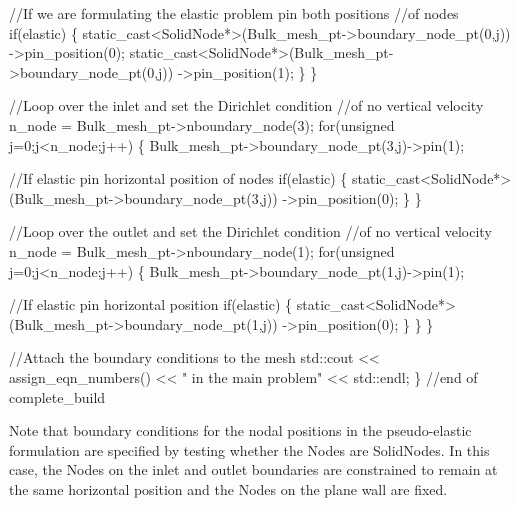 \begin{DoxyCodeInclude}
      \textcolor{comment}{//If we are formulating the elastic problem pin both positions}
      \textcolor{comment}{//of nodes}
      \textcolor{keywordflow}{if}(elastic)
       \{
        \textcolor{keyword}{static\_cast<}SolidNode*\textcolor{keyword}{>}(Bulk\_mesh\_pt->boundary\_node\_pt(0,j))
         ->pin\_position(0);
        \textcolor{keyword}{static\_cast<}SolidNode*\textcolor{keyword}{>}(Bulk\_mesh\_pt->boundary\_node\_pt(0,j))
         ->pin\_position(1);
       \}
     \}
    
    \textcolor{comment}{//Loop over the inlet and set the Dirichlet condition}
    \textcolor{comment}{//of no vertical velocity}
    n\_node = Bulk\_mesh\_pt->nboundary\_node(3);
    \textcolor{keywordflow}{for}(\textcolor{keywordtype}{unsigned} j=0;j<n\_node;j++)
     \{
      Bulk\_mesh\_pt->boundary\_node\_pt(3,j)->pin(1);

      \textcolor{comment}{//If elastic pin horizontal position of nodes}
      \textcolor{keywordflow}{if}(elastic)
       \{ 
        \textcolor{keyword}{static\_cast<}SolidNode*\textcolor{keyword}{>}(Bulk\_mesh\_pt->boundary\_node\_pt(3,j))
         ->pin\_position(0);
       \}
     \}
    
    \textcolor{comment}{//Loop over the outlet and set the Dirichlet condition}
    \textcolor{comment}{//of no vertical velocity}
    n\_node = Bulk\_mesh\_pt->nboundary\_node(1);
    \textcolor{keywordflow}{for}(\textcolor{keywordtype}{unsigned} j=0;j<n\_node;j++)
     \{
      Bulk\_mesh\_pt->boundary\_node\_pt(1,j)->pin(1);

      \textcolor{comment}{//If elastic pin horizontal position}
      \textcolor{keywordflow}{if}(elastic)
       \{ 
        \textcolor{keyword}{static\_cast<}SolidNode*\textcolor{keyword}{>}(Bulk\_mesh\_pt->boundary\_node\_pt(1,j))
         ->pin\_position(0);
       \}
     \}
   \}
 
   \textcolor{comment}{//Attach the boundary conditions to the mesh}
   std::cout << assign\_eqn\_numbers() << \textcolor{stringliteral}{" in the main problem"} << std::endl; 
  \} \textcolor{comment}{//end of complete\_build}

\end{DoxyCodeInclude}
 Note that boundary conditions for the nodal positions in the pseudo-\/elastic formulation are specified by testing whether the {\ttfamily Nodes} are {\ttfamily Solid\+Nodes}. In this case, the {\ttfamily Nodes} on the inlet and outlet boundaries are constrained to remain at the same horizontal position and the {\ttfamily Nodes} on the plane wall are fixed.

